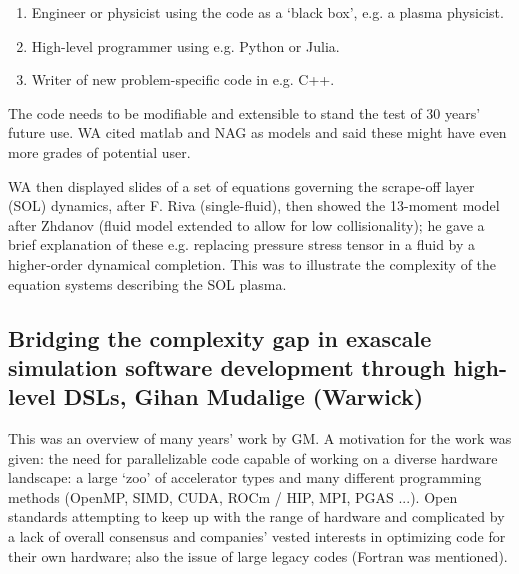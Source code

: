 \documentclass[11pt]{article}
\begin{document}
\begin{enumerate}
\item Engineer or physicist using the code as a `black box', e.g. a plasma 
physicist.
\item High-level programmer using e.g. Python or Julia.
\item Writer of new problem-specific code in e.g. C++.
\end{enumerate}

The code needs to be modifiable and extensible to stand the test of 30 years' 
future use.  WA cited matlab and NAG as models and said these might have even 
more grades of potential user.  

WA then displayed slides of a set of equations governing the scrape-off layer 
(SOL) dynamics, after F. Riva (single-fluid), then showed the 13-moment model 
after Zhdanov (fluid model extended to allow for low collisionality); he gave a 
brief explanation of these e.g. replacing pressure stress tensor in a fluid by a 
higher-order dynamical completion.  This was to illustrate the complexity of 
the equation systems describing the SOL plasma.

\subsection{Bridging the complexity gap in exascale simulation software 
development through high-level DSLs, Gihan Mudalige (Warwick)}

This was an overview of many years' work by GM.  A motivation for the work was 
given: the need for parallelizable code capable of working on a diverse 
hardware landscape: a large `zoo' of accelerator types and many different 
programming methods (OpenMP, SIMD, CUDA, ROCm / HIP, MPI, PGAS ...). Open 
standards attempting to keep up with the range of hardware and complicated by a 
lack of overall consensus and companies' vested interests in optimizing code 
for their own hardware; also the issue of large legacy codes (Fortran was 
mentioned).
\end{document}
